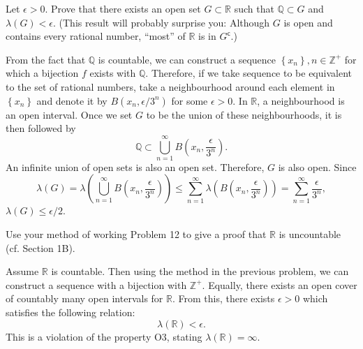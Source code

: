 \documentclass[answers]{exam}
\begin{document}
\begin{questions}
\begin{solution}
   \end{solution}
   
   \question
   Let $\epsilon > 0$. Prove that there exists an open set $G \subset \mathbb{R}$ such that $\mathbb{Q} \subset G$ and $\lambda\left(G\right) < \epsilon$. (This result will probably surprise you: Although $G$ is open and contains every rational number, ``most'' of $\mathbb{R}$ is in $G^{\mathsf{c}}$.)
   \begin{solution}
      From the fact that $\mathbb{Q}$ is countable, we can construct a sequence $\left\{x_{n} \right\}, n \in \mathbb{Z}^{+}$ for which a bijection $f$ exists with $\mathbb{Q}$. Therefore, if we take sequence to be equivalent to the set of rational numbers, take a neighbourhood around each element in $\left\{x_{n} \right\}$ and denote it by $B\left(x_{n}, \epsilon/3^{n}\right)$ for some $\epsilon>0$. In $\mathbb{R}$, a neighbourhood is an open interval. Once we set $G$ to be the union of these neighbourhoods, it is then followed by
      $$
         \mathbb{Q} \subset \bigcup_{n=1}^{\infty}B\left(x_{n}, \frac{\epsilon}{3^{n}}\right).
      $$
      An infinite union of open sets is also an open set. Therefore, $G$ is also open. Since
      $$
         \lambda\left(G\right) = \lambda\left(\bigcup_{n=1}^{\infty} B\left(x_{n}, \frac{\epsilon}{3^{n}}\right) \right) \leq \sum_{n=1}^{\infty}\lambda\left(B\left(x_{n}, \frac{\epsilon}{3^{n}}\right)\right) = \sum_{n=1}^{\infty} \frac{\epsilon}{3^{n}},
      $$
      $\lambda\left(G\right) \leq \epsilon/2$.
   \end{solution}
   \question
   Use your method of working Problem 12 to give a proof that $\mathbb{R}$ is uncountable (cf. Section 1B).
   \begin{solution}
      Assume $\mathbb{R}$ is countable. Then using the method in the previous problem, we can construct a sequence with a bijection with $\mathbb{Z}^{+}$. Equally, there exists an open cover of countably many open intervals for $\mathbb{R}$. From this, there exists $\epsilon > 0$ which satisfies the following relation:
      $$
         \lambda\left(\mathbb{R}\right) < \epsilon.
      $$
      This is a violation of the property O3, stating $\lambda\left(\mathbb{R}\right)=\infty$.
   \end{solution}
\end{questions}
\end{document}
